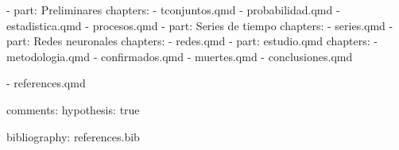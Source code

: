 \documentclass[
  letterpaper,
]{krantz}
\makeatletter
\newenvironment{Shaded}{\begin{snugshade}}{\end{snugshade}}
\newcommand{\AttributeTok}[1]{\textcolor[rgb]{0.40,0.45,0.13}{#1}}
\newcommand{\CharTok}[1]{\textcolor[rgb]{0.13,0.47,0.30}{#1}}
\newcommand{\FunctionTok}[1]{\textcolor[rgb]{0.28,0.35,0.67}{#1}}
\newcommand{\KeywordTok}[1]{\textcolor[rgb]{0.00,0.23,0.31}{#1}}
\newcommand{\StringTok}[1]{\textcolor[rgb]{0.13,0.47,0.30}{#1}}
\newenvironment{kframe}{%
\medskip{}
\setlength{\fboxsep}{.8em}
 \def\at@end@of@kframe{}%
 \ifinner\ifhmode%
  \def\at@end@of@kframe{\end{minipage}}%
  \begin{minipage}{\columnwidth}%
 \fi\fi%
 \def\FrameCommand##1{\hskip\@totalleftmargin \hskip-\fboxsep
 \colorbox{shadecolor}{##1}\hskip-\fboxsep
     \hskip-\linewidth \hskip-\@totalleftmargin \hskip\columnwidth}%
 \MakeFramed {\advance\hsize-\width
   \@totalleftmargin\z@ \linewidth\hsize
   \@setminipage}}%
 {\par\unskip\endMakeFramed%
 \at@end@of@kframe}
\renewenvironment{Shaded}{\begin{kframe}}{\end{kframe}}
\theoremstyle{plain}
\theoremstyle{definition}
\theoremstyle{definition}
\theoremstyle{remark}
\makeatother
\begin{document}
\begin{codelisting}
\begin{Shaded}
\begin{Highlighting}[]
\AttributeTok{    }\KeywordTok{{-}}\AttributeTok{ }\FunctionTok{part}\KeywordTok{:}\AttributeTok{ }\StringTok{\textquotesingle{}Preliminares\textquotesingle{}}
\AttributeTok{      }\FunctionTok{chapters}\KeywordTok{:}
\AttributeTok{        }\KeywordTok{{-}}\AttributeTok{ tconjuntos.qmd}
\AttributeTok{        }\KeywordTok{{-}}\AttributeTok{ probabilidad.qmd}
\AttributeTok{        }\KeywordTok{{-}}\AttributeTok{ estadistica.qmd}
\AttributeTok{        }\KeywordTok{{-}}\AttributeTok{ procesos.qmd}
\AttributeTok{    }\KeywordTok{{-}}\AttributeTok{ }\FunctionTok{part}\KeywordTok{:}\AttributeTok{ }\StringTok{\textquotesingle{}Series de tiempo\textquotesingle{}}
\AttributeTok{      }\FunctionTok{chapters}\KeywordTok{:}
\AttributeTok{        }\KeywordTok{{-}}\AttributeTok{ series.qmd}
\AttributeTok{    }\KeywordTok{{-}}\AttributeTok{ }\FunctionTok{part}\KeywordTok{:}\AttributeTok{ }\StringTok{\textquotesingle{}Redes neuronales\textquotesingle{}}
\AttributeTok{      }\FunctionTok{chapters}\KeywordTok{:}
\AttributeTok{        }\KeywordTok{{-}}\AttributeTok{ redes.qmd}
\AttributeTok{    }\KeywordTok{{-}}\AttributeTok{ }\FunctionTok{part}\KeywordTok{:}\AttributeTok{ estudio.qmd}
\AttributeTok{      }\FunctionTok{chapters}\KeywordTok{:}
\AttributeTok{        }\KeywordTok{{-}}\AttributeTok{ metodologia.qmd}
\AttributeTok{        }\KeywordTok{{-}}\AttributeTok{ confirmados.qmd}
\AttributeTok{        }\KeywordTok{{-}}\AttributeTok{ muertes.qmd}
\AttributeTok{    }\KeywordTok{{-}}\AttributeTok{ conclusiones.qmd}

\AttributeTok{    }\KeywordTok{{-}}\AttributeTok{ references.qmd}

\FunctionTok{comments}\KeywordTok{:}
\AttributeTok{    }\FunctionTok{hypothesis}\KeywordTok{:}\AttributeTok{ }\CharTok{true}

\FunctionTok{bibliography}\KeywordTok{:}\AttributeTok{ references.bib}


\end{Highlighting}
\end{Shaded}
\end{codelisting}
\end{document}
